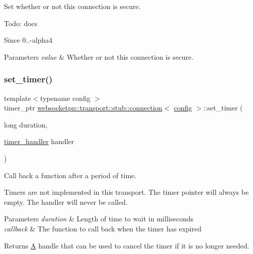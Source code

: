Set whether or not this connection is secure. 

Todo\+: docs

\begin{DoxySince}{Since}
0..-\/alpha4
\end{DoxySince}

\begin{DoxyParams}{Parameters}
{\em value} & Whether or not this connection is secure. \\
\hline
\end{DoxyParams}
\mbox{\label{classwebsocketpp_1_1transport_1_1stub_1_1connection_a0566c24deef4c7e5bff957510c366b26}} 
\subsubsection{\texorpdfstring{set\+\_\+timer()}{set\_timer()}}
{\footnotesize\ttfamily template$<$typename config $>$ \\
timer\+\_\+ptr \mbox{\hyperlink{classwebsocketpp_1_1transport_1_1stub_1_1connection}{websocketpp\+::transport\+::stub\+::connection}}$<$ \mbox{\hyperlink{classconfig}{config}} $>$\+::set\+\_\+timer (\begin{DoxyParamCaption}\item[{long}]{duration,  }\item[{\mbox{\hyperlink{namespacewebsocketpp_1_1transport_a946cc56ff41139f3002149c15fd87bc9}{timer\+\_\+handler}}}]{handler }\end{DoxyParamCaption})\hspace{0.3cm}{\ttfamily [inline]}}



Call back a function after a period of time. 

Timers are not implemented in this transport. The timer pointer will always be empty. The handler will never be called.


\begin{DoxyParams}{Parameters}
{\em duration} & Length of time to wait in milliseconds \\
\hline
{\em callback} & The function to call back when the timer has expired \\
\hline
\end{DoxyParams}
\begin{DoxyReturn}{Returns}
\mbox{\hyperlink{struct_a}{A}} handle that can be used to cancel the timer if it is no longer needed. 
\end{DoxyReturn}
\mbox{\label{classwebsocketpp_1_1transport_1_1stub_1_1connection_ae542c0f0813c3943f8cf9739ead09961}} 
